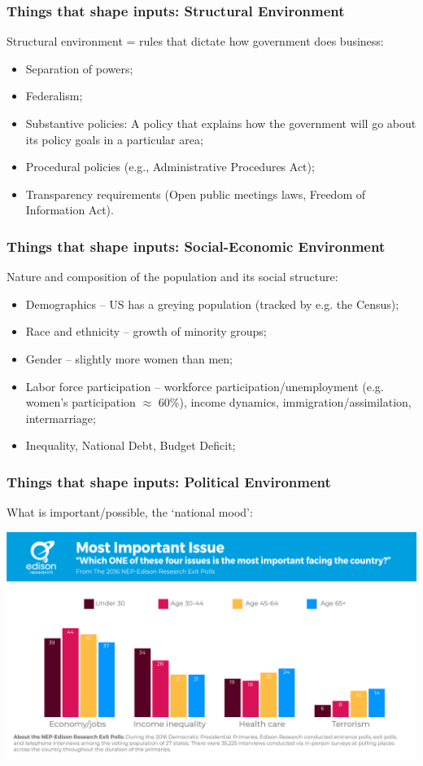 \documentclass[aspectratio=169]{beamer}
\theoremstyle{principle}
\begin{document}
\begin{frame}
\frametitle{Things that shape inputs: Structural Environment}
Structural environment = rules that dictate how government does business:
\bigskip
\begin{itemize}
\item<2-> Separation of powers;
\bigskip
\item<2-> Federalism;
\bigskip
\item<2-> Substantive policies: A policy that explains how the government will go about its policy goals in a particular area;
\bigskip
\item<2-> Procedural policies (e.g., Administrative Procedures Act);
\bigskip
\item<2-> Transparency requirements (Open public meetings laws, Freedom of Information Act).
\end{itemize}
\end{frame}

\begin{frame}
\frametitle{Things that shape inputs: Social-Economic Environment}
Nature and composition of the population and its social structure:
\bigskip
\begin{itemize}
\item<2-> Demographics -- US has a greying population (tracked by e.g. the Census);
\bigskip
\item<2-> Race and ethnicity -- growth of minority groups;
\bigskip
\item<2-> Gender -- slightly more women than men;
\bigskip
\item<2-> Labor force participation -- workforce participation/unemployment (e.g. women's participation $\approx$ 60\%), income dynamics, immigration/assimilation, intermarriage;
\bigskip
\item<2-> Inequality, National Debt, Budget Deficit;
\end{itemize}
\end{frame}

\begin{frame}
\frametitle{Things that shape inputs: Political Environment}
What is important/possible, the `national mood':
    \begin{center}
     \includegraphics[scale=0.3]{mip.png}
     \end{center}

\end{frame}
\end{document}
